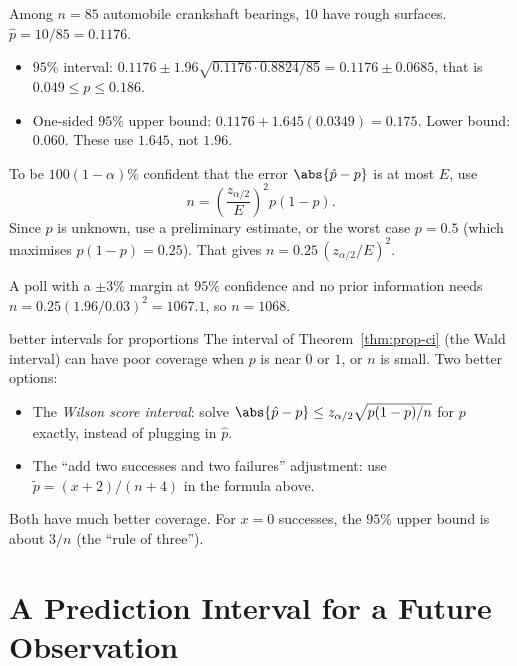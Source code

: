 \begin{example}
Among $n=85$ automobile crankshaft bearings, $10$ have rough surfaces. $\hat{p}=10/85=0.1176$.
\begin{itemize}
  \item $95\%$ interval: $0.1176\pm1.96\sqrt{0.1176\cdot0.8824/85}=0.1176\pm0.0685$, that is $0.049\le p\le0.186$.
  \item One-sided $95\%$ upper bound: $0.1176+1.645(0.0349)=0.175$. Lower bound: $0.060$. These use $1.645$, not $1.96$.
\end{itemize}
\end{example}

\begin{theorem}\label{thm:samplesize-prop}
To be $100(1-\alpha)\%$ confident that the error $\abs{\hat{p}-p}$ is at most $E$, use
\[ n=\left(\frac{z_{\alpha/2}}E\right)^2p(1-p). \]
Since $p$ is unknown, use a preliminary estimate, or the worst case $p=0.5$ (which maximises $p(1-p)=0.25$). That gives $n=0.25\,(z_{\alpha/2}/E)^2$.
\end{theorem}

\begin{example}
A poll with a $\pm3\%$ margin at $95\%$ confidence and no prior information needs $n=0.25(1.96/0.03)^2=1067.1$, so $n=1068$.
\end{example}

\begin{interview}{better intervals for proportions}
The interval of Theorem~\ref{thm:prop-ci} (the Wald interval) can have poor coverage when $p$ is near $0$ or $1$, or $n$ is small. Two better options:
\begin{itemize}
  \item The \emph{Wilson score interval}: solve $\abs{\hat{p}-p}\le z_{\alpha/2}\sqrt{p(1-p)/n}$ for $p$ exactly, instead of plugging in $\hat{p}$.
  \item The ``add two successes and two failures'' adjustment: use $\tilde{p}=(x+2)/(n+4)$ in the formula above.
\end{itemize}
Both have much better coverage. For $x=0$ successes, the $95\%$ upper bound is about $3/n$ (the ``rule of three'').
\end{interview}

\section{A Prediction Interval for a Future Observation}

